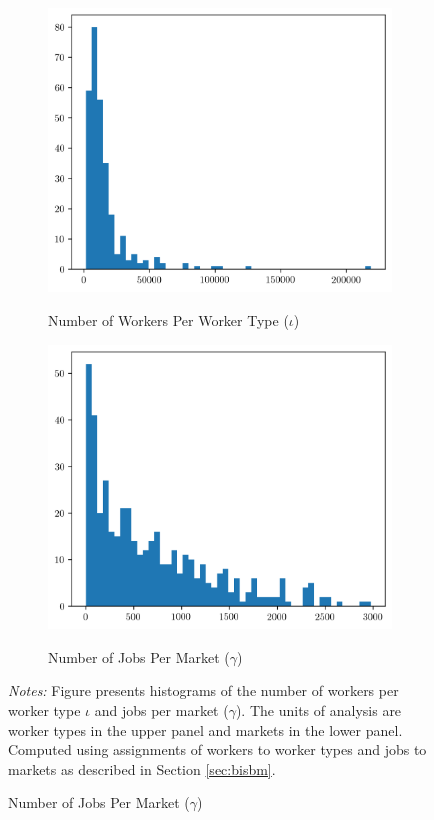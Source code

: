 \documentclass[12pt]{article}
\def\g{\gamma}
\def\i{\iota}
\theoremstyle{definition}
\theoremstyle{plain}
\begin{document}
\begin{figure}
	\centering
	\caption{Worker Type ($\i$) and Market ($\g$) Size Distributions}
	\begin{subfigure}{\textwidth}
		\centering
		\caption{Number of Workers Per Worker Type ($\i$)}
		\includegraphics[width=0.7\linewidth]{../Results/iota_size_distribution}
		\label{fig:iota_size_distribution}
	\end{subfigure}
	\begin{subfigure}{\textwidth}
		\centering
		\caption{Number of Jobs Per Market ($\g$)}
		\includegraphics[width=0.7\linewidth]{../Results/gamma_size_distribution}
		\label{fig:gamma_size_distribution}
	\end{subfigure}
	\label{fig:iota_gamma_size_distribution}
	\footnotesize\flushleft \emph{Notes:} Figure presents histograms of the number of workers per worker type $\i$ and jobs per market ($\g$). The units of analysis are worker types in the upper panel and markets in the lower panel. Computed using assignments of workers to worker types and jobs to markets as described in Section \ref{sec:bisbm}.
\end{figure}
\end{document}

